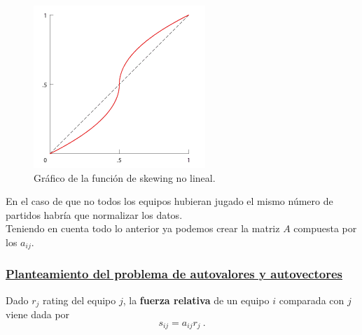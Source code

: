 \begin{figure}[htb]
	\centering
	\includegraphics{images/funcion_keener.png}
	\caption{Gráfico de la función de skewing no lineal.} \label{fig:func_skew}
\end{figure}

En el caso de que no todos los equipos hubieran jugado el mismo número de partidos habría que normalizar los datos.\\

Teniendo en cuenta todo lo anterior ya podemos crear la matriz $A$ compuesta por los $a_{ij}$.

\subsubsection*{\underline{Planteamiento del problema de autovalores y autovectores}}
\begin{defi} 
	Dado $r_{j}$ rating del equipo $j$, la \textbf{fuerza relativa} de un equipo $i$ comparada con $j$ viene dada por
	\begin{equation}
		s_{ij} = a_{ij}r_{j} \ .
	\end{equation}
\end{defi}

